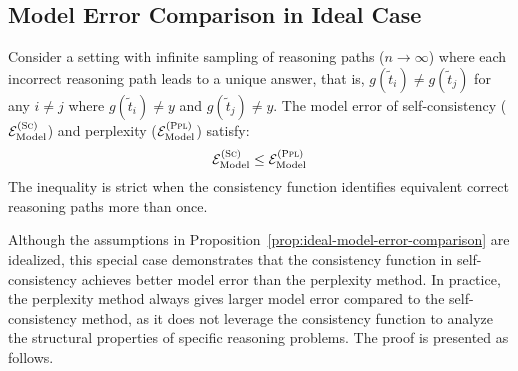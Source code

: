     



\subsection{Model Error Comparison in Ideal Case}
\label{subsec:model-error-comparison-ideal}

\begin{proposition}
    Consider a setting with infinite sampling of reasoning paths ($n \to \infty$) where each incorrect reasoning path leads to a unique answer, that is, $g(\tilde{t}_i) \neq g(\tilde{t}_j)$ for any $i \neq j$ where $g(\tilde{t}_i) \neq y$ and $g(\tilde{t}_j) \neq y$. The model error of self-consistency ($\mathcal{E}_{\text{Model}}^{(\textsc{Sc})}$) and perplexity ($\mathcal{E}_{\text{Model}}^{(\textsc{Ppl})}$) satisfy:
    \begin{equation}
        \mathcal{E}_{\text{Model}}^{(\textsc{Sc})} \leq \mathcal{E}_{\text{Model}}^{(\textsc{Ppl})}
    \end{equation}
    The inequality is strict when the consistency function identifies equivalent correct reasoning paths more than once.
    \label{prop:ideal-model-error-comparison}
\end{proposition}

\begin{remark}
    Although the assumptions in Proposition~\ref{prop:ideal-model-error-comparison} are idealized, this special case demonstrates that the consistency function in self-consistency achieves better model error than the perplexity method. 
    In practice, the perplexity method always gives larger model error compared to the self-consistency method, as it does not leverage the consistency function to analyze the structural properties of specific reasoning problems.
    The proof is presented as follows.
\end{remark}


